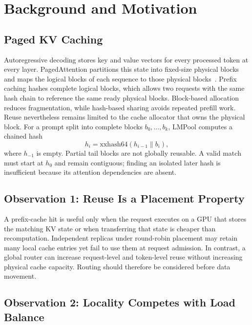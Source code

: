 \documentclass{article}
\newcommand{\sys}{LMPool}
\begin{document}
\section{Background and Motivation}
\label{sec:bg}

\subsection{Paged KV Caching}

Autoregressive decoding stores key and value vectors for every processed token at every layer. PagedAttention partitions this state into fixed-size physical blocks and maps the logical blocks of each sequence to those physical blocks~\citep{vLLM}. Prefix caching hashes complete logical blocks, which allows two requests with the same hash chain to reference the same ready physical blocks. Block-based allocation reduces fragmentation, while hash-based sharing avoids repeated prefill work. Reuse nevertheless remains limited to the cache allocator that owns the physical block. For a prompt split into complete blocks $b_0,\ldots,b_k$, \sys{} computes a chained hash
\begin{equation}
  h_i = \mathrm{xxhash64}(h_{i-1} \parallel b_i),
\end{equation}
where $h_{-1}$ is empty. Partial tail blocks are not globally reusable. A valid match must start at $h_0$ and remain contiguous; finding an isolated later hash is insufficient because its attention dependencies are absent.

\subsection{Observation 1: Reuse Is a Placement Property}

A prefix-cache hit is useful only when the request executes on a GPU that stores the matching KV state or when transferring that state is cheaper than recomputation. Independent replicas under round-robin placement may retain many local cache entries yet fail to use them at request admission. In contrast, a global router can increase request-level and token-level reuse without increasing physical cache capacity. Routing should therefore be considered before data movement.

\subsection{Observation 2: Locality Competes with Load Balance}
\end{document}
